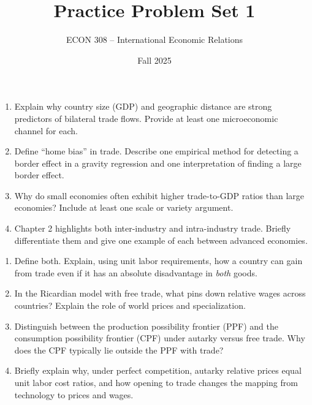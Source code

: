 \documentclass[11pt]{article}
\title{Practice Problem Set 1}
\author{ECON 308 -- International Economic Relations}
\date{Fall 2025}
\begin{document}
\maketitle



\begin{enumerate}[leftmargin=*]
\item Explain why country size (GDP) and geographic distance are strong predictors of bilateral trade flows. Provide at least one microeconomic channel for each.
\item Define ``home bias'' in trade. Describe one empirical method for detecting a border effect in a gravity regression and one interpretation of finding a large border effect.
\item Why do small economies often exhibit higher trade-to-GDP ratios than large economies? Include at least one scale or variety argument.
\item Chapter 2 highlights both inter-industry and intra-industry trade. Briefly differentiate them and give one example of each between advanced economies.
\end{enumerate}


\begin{enumerate}[leftmargin=*, resume]
\item Define both. Explain, using unit labor requirements, how a country can gain from trade even if it has an absolute disadvantage in \emph{both} goods.
\item In the Ricardian model with free trade, what pins down relative wages across countries? Explain the role of world prices and specialization.
\item Distinguish between the production possibility frontier (PPF) and the consumption possibility frontier (CPF) under autarky versus free trade. Why does the CPF typically lie outside the PPF with trade?
\item Briefly explain why, under perfect competition, autarky relative prices equal unit labor cost ratios, and how opening to trade changes the mapping from technology to prices and wages.
\end{enumerate}
\bigskip
\end{document}
